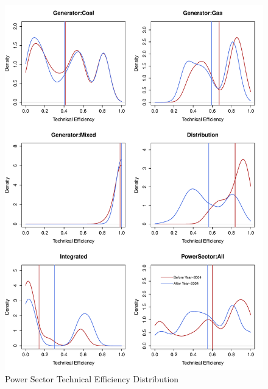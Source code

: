 \begin{figure}[h]
	\centering
	\caption{Power Sector Technical Efficiency Distribution}
	\label{fig:EffDistr}
		\includegraphics[width=1.00\textwidth]{chapter02/EffDistr.pdf}	
\end{figure}

